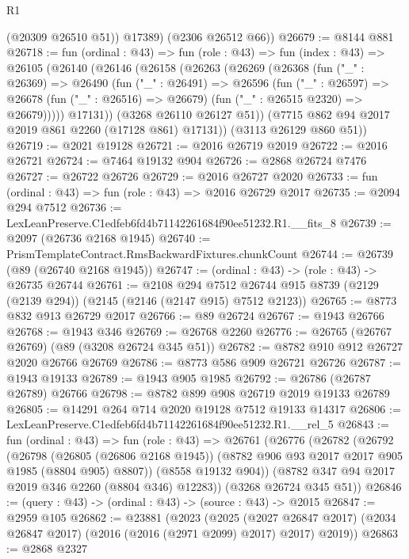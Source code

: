 \begin{lexlean}{R1}
\begin{coremodule}
          (@20309 @26510 @51))
        @17389)
      (@2306 @26512 @66))
@26679 := @8144 @881
@26718 := fun (ordinal : @43) =>
  fun (role : @43) =>
  fun (index : @43) =>
  @26105
    (@26140
      (@26146
        (@26158
          (@26263
            (@26269
              (@26368
                (fun ("_" : @26369) =>
                @26490
                  (fun ("_" : @26491) =>
                  @26596
                    (fun ("_" : @26597) =>
                    @26678 (fun ("_" : @26516) => @26679) (fun ("_" : @26515 @2320) => @26679)))))
              @17131))
          (@3268 @26110 @26127 @51))
        (@7715 @862 @94 @2017 @2019 @861 @2260 (@17128 @861) @17131))
      (@3113 @26129 @860 @51))
@26719 := @2021 @19128
@26721 := @2016 @26719 @2019
@26722 := @2016 @26721
@26724 := @7464 @19132 @904
@26726 := @2868 @26724 @7476
@26727 := @26722 @26726
@26729 := @2016 @26727 @2020
@26733 := fun (ordinal : @43) => fun (role : @43) => @2016 @26729 @2017
@26735 := @2094 @294 @7512
@26736 := LexLeanPreserve.C1edfeb6fd4b71142261684f90ee51232.R1.__fits_8
@26739 := @2097 (@26736 @2168 @1945)
@26740 := PrismTemplateContract.RmsBackwardFixtures.chunkCount
@26744 := @26739 (@89 (@26740 @2168 @1945))
@26747 := (ordinal : @43) -> (role : @43) -> @26735 @26744
@26761 := @2108
    @294
    @7512
    @26744
    @915
    @8739
    (@2129 (@2139 @294))
    (@2145 (@2146 (@2147 @915) @7512 @2123))
@26765 := @8773 @832 @913 @26729 @2017
@26766 := @89 @26724
@26767 := @1943 @26766
@26768 := @1943 @346
@26769 := @26768 @2260
@26776 := @26765 (@26767 @26769) (@89 (@3208 @26724 @345 @51))
@26782 := @8782 @910 @912 @26727 @2020 @26766 @26769
@26786 := @8773 @586 @909 @26721 @26726
@26787 := @1943 @19133
@26789 := @1943 @905 @1985
@26792 := @26786 (@26787 @26789) @26766
@26798 := @8782 @899 @908 @26719 @2019 @19133 @26789
@26805 := @14291 @264 @714 @2020 @19128 @7512 @19133 @14317
@26806 := LexLeanPreserve.C1edfeb6fd4b71142261684f90ee51232.R1.__rel_5
@26843 := fun (ordinal : @43) =>
  fun (role : @43) =>
  @26761
    (@26776
      (@26782
        (@26792
          (@26798
            (@26805 (@26806 @2168 @1945))
            (@8782 @906 @93 @2017 @2017 @905 @1985 (@8804 @905) @8807))
          (@8558 @19132 @904))
        (@8782 @347 @94 @2017 @2019 @346 @2260 (@8804 @346) @12283))
      (@3268 @26724 @345 @51))
@26846 := (query : @43) -> (ordinal : @43) -> (source : @43) -> @2015
@26847 := @2959 @105
@26862 := @23881
    (@2023
      (@2025
        (@2027 @26847 @2017)
        (@2034 @26847 @2017)
        (@2016 (@2016 (@2971 @2099) @2017) @2017)
        @2019))
@26863 := @2868 @2327

\end{coremodule}
\end{lexlean}
